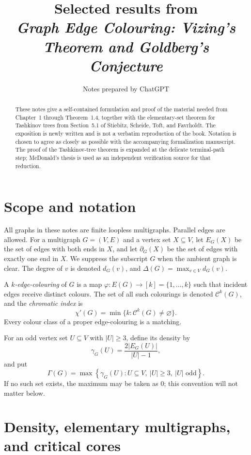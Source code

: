 \documentclass[11pt]{article}
\title{\textbf{Selected results from}\\[0.4em]
  \emph{Graph Edge Colouring: Vizing's Theorem and Goldberg's Conjecture}}
\author{Notes prepared by ChatGPT}
\date{}
\theoremstyle{definition}
\newcommand{\calC}{\mathcal C}
\newcommand{\abs}[1]{\lvert #1\rvert}
\newcommand{\boundary}{\partial}
\begin{document}
\maketitle

\begin{abstract}
These notes give a self-contained formulation and proof of the material needed from
Chapter~1 through Theorem~1.4, together with the elementary-set theorem for
Tashkinov trees from Section~5.1 of Stiebitz, Scheide, Toft, and Favrholdt.
The exposition is newly written and is not a verbatim reproduction of the book.
Notation is chosen to agree as closely as possible with the accompanying
formalization manuscript.  The proof of the Tashkinov-tree theorem is expanded
at the delicate terminal-path step; McDonald's thesis is used as an independent
verification source for that reduction.
\end{abstract}

\tableofcontents

\section{Scope and notation}

All graphs in these notes are finite loopless multigraphs.  Parallel edges are
allowed.  For a multigraph $G=(V,E)$ and a vertex set $X\subseteq V$, let
$E_G(X)$ be the set of edges with both ends in $X$, and let
$\boundary_G(X)$ be the set of edges with exactly one end in $X$.  We suppress
the subscript $G$ when the ambient graph is clear.  The degree of $v$ is denoted
$d_G(v)$, and $\Delta(G)=\max_{v\in V}d_G(v)$.

A \emph{$k$-edge-colouring} of $G$ is a map
$\varphi:E(G)\to [k]=\{1,\ldots,k\}$ such that incident edges receive distinct
colours.  The set of all such colourings is denoted $\calC^k(G)$, and the
\emph{chromatic index} is
\[
  \chi'(G)=\min\{k:\calC^k(G)\neq\varnothing\}.
\]
Every colour class of a proper edge-colouring is a matching.

For an odd vertex set $U\subseteq V$ with $\abs U\ge 3$, define its density by
\[
  \gamma_G(U)=\frac{2\abs{E_G(U)}}{\abs U-1},
\]
and put
\[
  \Gamma(G)=\max\left\{\gamma_G(U):
  U\subseteq V,\ \abs U\ge 3,\ \abs U\text{ odd}\right\}.
\]
If no such set exists, the maximum may be taken as $0$; this convention will not
matter below.

\section{Density, elementary multigraphs, and critical cores}
\end{document}
